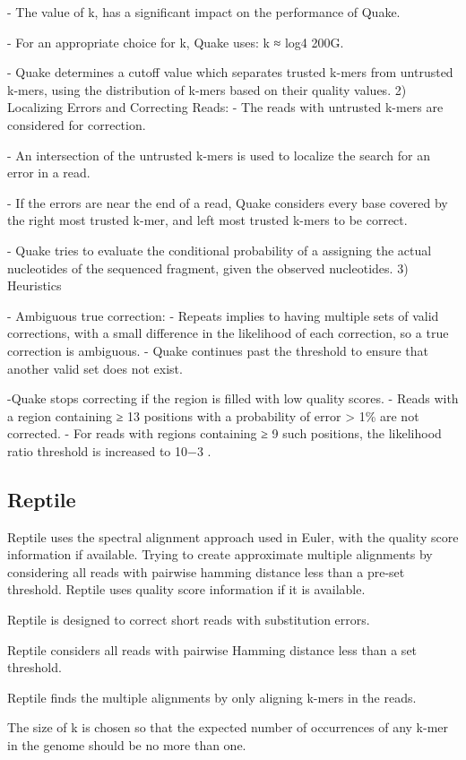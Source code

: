 \documentclass{llncs}
\begin{document}
- The value of k, has a significant impact on the performance of Quake.

- For an appropriate choice for k, Quake uses: k ≈ log4 200G.

- Quake determines a cutoff value which separates trusted k-mers from untrusted k-mers, using the distribution of k-mers based on their quality values. 
2) Localizing Errors and Correcting Reads:
- The reads with untrusted k-mers are considered for correction. 

- An intersection of the untrusted k-mers is used to localize the search for an error in a read.

- If the errors are near the end of a read,  Quake considers every base covered by the right most trusted k-mer, and left most trusted k-mers to be correct.

- Quake tries to evaluate the conditional probability of a assigning the actual nucleotides of the sequenced fragment, given the observed nucleotides.
3) Heuristics

- Ambiguous true correction: 
  - Repeats implies to having multiple sets of valid corrections, with a small difference in the likelihood of
     each correction, so a true correction is ambiguous.
  - Quake continues past the threshold to ensure that another valid set does not exist. 

-Quake stops correcting if the region is filled with low quality scores.
   - Reads with a region containing ≥ 13 positions with a probability of error > 1\% are not corrected. 
   - For reads with regions containing ≥ 9 such positions, the likelihood ratio threshold is increased to 10−3 .
\subsection{Reptile}
Reptile \cite{Reptile} uses the spectral alignment approach used in Euler, with the quality score information if available. Trying to create approximate multiple alignments by considering all reads with pairwise hamming distance less than a pre-set threshold. 
Reptile uses quality score information if it is available. 

Reptile is designed to correct short reads with substitution errors.

Reptile considers all reads with pairwise Hamming distance less than a set threshold. 

Reptile finds the multiple alignments by only aligning k-mers in the reads. 

The size of k is chosen so that the expected number of occurrences of any
k-mer in the genome should be no more than one.
\end{document}
